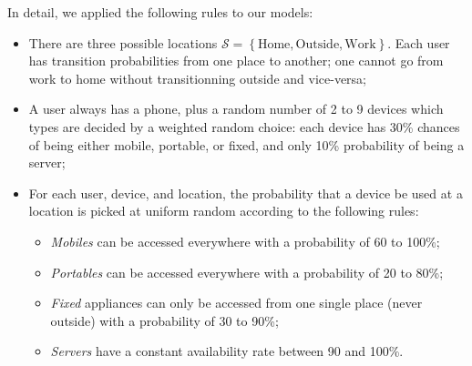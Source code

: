 In detail, we applied the following rules to our models: 
\begin{itemize}
  \item There are three possible locations $\mathcal{S}=\left\{\text{Home}, \text{Outside}, \text{Work}\right\}$.
  Each user has transition probabilities from one place to another;
  one cannot go from work to home without transitionning outside and vice-versa;
  \item A user always has a phone, plus a random number of 2 to 9 devices which types are decided by a weighted random choice: each device has 30\% chances of being either mobile, portable, or fixed, and only 10\% probability of being a server;
  \item For each user, device, and location, the probability that a device be used at a location is picked at uniform random according to the following rules:
  \begin{itemize}
    \item \emph{Mobiles} can be accessed everywhere with a probability of 60 to 100\%;
    \item \emph{Portables} can be accessed everywhere with a probability of 20 to 80\%;
    \item \emph{Fixed} appliances can only be accessed from one single place (never outside) with a probability of 30 to 90\%;
    \item \emph{Servers} have a constant availability rate between 90 and 100\%.
  \end{itemize}
\end{itemize}


